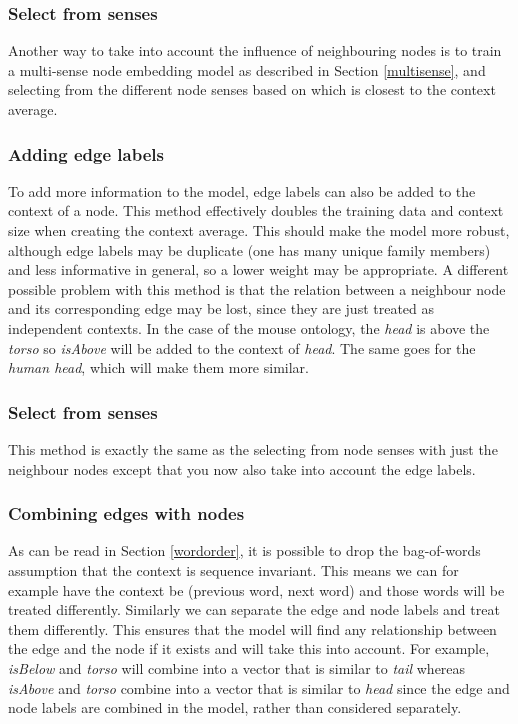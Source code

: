 \documentclass{article}
\begin{document}
  \subsubsection{Select from senses}
  Another way to take into account the influence of neighbouring nodes is to train a multi-sense node embedding model as described in Section \ref{multisense}, and selecting from the different node senses based on which is closest to the context average.
  \subsubsection{Adding edge labels}
  To add more information to the model, edge labels can also be added to the context of a node. This method effectively doubles the training data and context size when creating the context average. This should make the model more robust, although edge labels may be duplicate (one has many unique family members) and less informative in general, so a lower weight may be appropriate. A different possible problem with this method is that the relation between a neighbour node and its corresponding edge may be lost, since they are just treated as independent contexts.
  In the case of the mouse ontology, the \emph{head} is above the \emph{torso} so \emph{isAbove} will be added to the context of \emph{head}. The same goes for the \emph{human head}, which will make them more similar.
  \subsubsection{Select from senses}
  This method is exactly the same as the selecting from node senses with just the neighbour nodes except that you now also take into account the edge labels.
  \subsubsection{Combining edges with nodes}
  As can be read in Section \ref{wordorder}, it is possible to drop the bag-of-words assumption that the context is sequence invariant.
  This means we can for example have the context be (previous word, next word) and those words will be treated differently. Similarly we can separate the edge and node labels and treat them differently. This ensures that the model will find any relationship between the edge and the node if it exists and will take this into account. For example, \emph{isBelow} and \emph{torso} will combine into a vector that is similar to \emph{tail} whereas \emph{isAbove} and \emph{torso} combine into a vector that is similar to \emph{head} since the edge and node labels are combined in the model, rather than considered separately.
\end{document}
